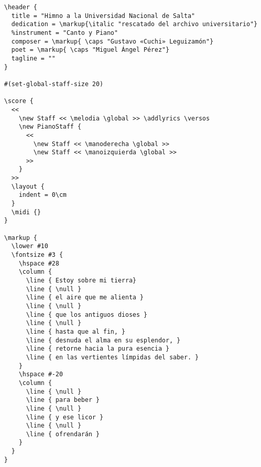 {\begin{verbatim}
\header {
  title = "Himno a la Universidad Nacional de Salta"
  dedication = \markup{\italic "rescatado del archivo universitario"}
  %instrument = "Canto y Piano"
  composer = \markup{ \caps "Gustavo «Cuchi» Leguizamón"}
  poet = \markup{ \caps "Miguel Ángel Pérez"}
  tagline = ""
}

#(set-global-staff-size 20)

\score {
  <<
    \new Staff << \melodia \global >> \addlyrics \versos
    \new PianoStaff {
      <<
        \new Staff << \manoderecha \global >>
        \new Staff << \manoizquierda \global >>
      >>
    }
  >>
  \layout {
    indent = 0\cm
  }
  \midi {}
}

\markup {
  \lower #10
  \fontsize #3 {
    \hspace #28
    \column {
      \line { Estoy sobre mi tierra}
      \line { \null }
      \line { el aire que me alienta }
      \line { \null }
      \line { que los antiguos dioses }
      \line { \null }
      \line { hasta que al fin, }
      \line { desnuda el alma en su esplendor, }
      \line { retorne hacia la pura esencia }
      \line { en las vertientes límpidas del saber. }
    }
    \hspace #-20
    \column {
      \line { \null }
      \line { para beber }
      \line { \null }
      \line { y ese licor }
      \line { \null }
      \line { ofrendarán }
    }
  }
}
\end{verbatim}
}
